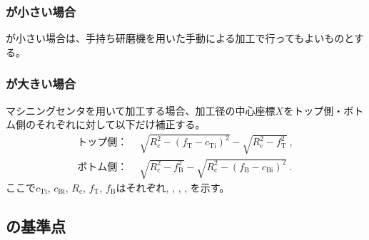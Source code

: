 \subsubsection{\EndFaceInCChamferLength が小さい場合}
\EndFaceInCChamferLength が小さい場合は、手持ち研磨機を用いた手動による加工で行ってもよいものとする。

\subsubsection{\EndFaceInCChamferLength が大きい場合}
マシニングセンタを用いて加工する場合、加工径の中心座標$X$をトップ側・ボトム側のそれぞれに対して以下だけ補正する。
\begin{align*}
  \text{トップ側：}&~~
  \sqrt{R_\mathrm c^2-\left(f_\mathrm T-c_\mathrm{Ti}\right)^2}-\sqrt{R_\mathrm c^2-f_\mathrm T^2}\ ,\\
  \text{ボトム側：}&~~
  \sqrt{R_\mathrm c^2-f_\mathrm B^2}-\sqrt{R_\mathrm c^2-\left(f_\mathrm B-c_\mathrm{Bi}\right)^2}\ .
\end{align*}
ここで$c_\mathrm{Ti}$, $c_\mathrm{Bi}$, $R_\mathrm c$, $f_\mathrm T$, $f_\mathrm B$はそれぞれ\TopEndFaceInCChamferLength, \BottomEndFaceInCChamferLength, \CenterCurvatureRadius, \TopAlocationLength, \BottomAlocationLength を示す。



\clearpage


\subsection{\EndFaceRChamferMilling の基準点}

